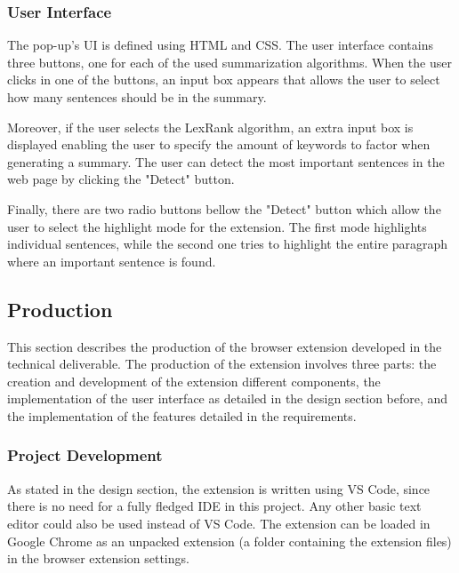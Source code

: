 \documentclass[conference,compsoc]{IEEEtran}
\begin{document}
\subsubsection{User Interface}


The pop-up's UI is defined using HTML and CSS.
The user interface contains three buttons, one for each of the used summarization algorithms.
When the user clicks in one of the buttons, an input box appears that allows the user to select how many sentences should be in the summary.

Moreover, if the user selects the LexRank algorithm, an extra input box is displayed enabling the user to specify the amount of keywords to factor when generating a summary.
The user can detect the most important sentences in the web page by clicking the "Detect" button.

Finally, there are two radio buttons bellow the "Detect" button which allow the user to select the highlight mode for the extension.
The first mode highlights individual sentences, while the second one tries to highlight the entire paragraph where an important sentence is found.


\subsection{Production}

This section describes the production of the browser extension developed in the technical deliverable.
The production of the extension involves three parts: the creation and development of the extension different components, the implementation of the user interface as detailed in the design section before, and the implementation of the features detailed in the requirements.

\subsubsection{Project Development}


As stated in the design section, the extension is written using VS Code, since there is no need for a fully fledged IDE in this project. Any other basic text editor could also be used instead of VS Code. The extension can be loaded in Google Chrome as an unpacked extension (a folder containing the extension files) in the browser extension settings.
\end{document}
